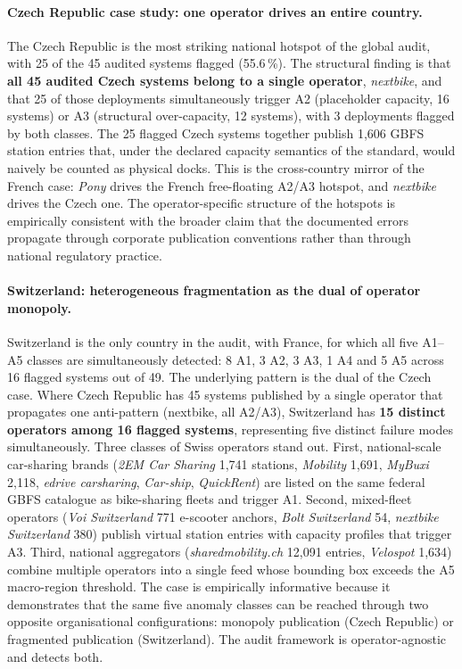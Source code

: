 \documentclass[11pt,a4paper]{article}
\begin{document}
\paragraph{Czech Republic case study: one operator drives an entire country.}
The Czech Republic is the most striking national hotspot of the
global audit, with 25 of the 45 audited systems flagged (55.6\,\%).
The structural finding is that \textbf{all 45 audited Czech systems
belong to a single operator}, \emph{nextbike}, and that 25 of those
deployments simultaneously trigger A2 (placeholder capacity, 16
systems) or A3 (structural over-capacity, 12 systems), with 3
deployments flagged by both classes. The 25 flagged Czech systems
together publish 1{,}606 GBFS station entries that, under the
declared capacity semantics of the standard, would naively be
counted as physical docks. This is the cross-country mirror of the
French case: \emph{Pony} drives the French free-floating A2/A3
hotspot, and \emph{nextbike} drives the Czech one. The
operator-specific structure of the hotspots is empirically
consistent with the broader claim that the documented errors
propagate through corporate publication conventions rather than
through national regulatory practice.

\paragraph{Switzerland: heterogeneous fragmentation as the dual of operator monopoly.}
Switzerland is the only country in the audit, with France, for which
all five A1--A5 classes are simultaneously detected: 8 A1, 3 A2, 3
A3, 1 A4 and 5 A5 across 16 flagged systems out of 49. The
underlying pattern is the dual of the Czech case. Where Czech
Republic has 45 systems published by a single operator that
propagates one anti-pattern (nextbike, all A2/A3), Switzerland has
\textbf{15 distinct operators among 16 flagged systems},
representing five distinct failure modes simultaneously. Three
classes of Swiss operators stand out. First, national-scale
car-sharing brands (\emph{2EM Car Sharing} 1{,}741 stations,
\emph{Mobility} 1{,}691, \emph{MyBuxi} 2{,}118, \emph{edrive
carsharing}, \emph{Car-ship}, \emph{QuickRent}) are listed on the
same federal GBFS catalogue as bike-sharing fleets and trigger A1.
Second, mixed-fleet operators (\emph{Voi Switzerland} 771 e-scooter
anchors, \emph{Bolt Switzerland} 54, \emph{nextbike Switzerland}
380) publish virtual station entries with capacity profiles that
trigger A3. Third, national aggregators
(\emph{sharedmobility.ch} 12{,}091 entries, \emph{Velospot} 1{,}634)
combine multiple operators into a single feed whose bounding box
exceeds the A5 macro-region threshold. The case is empirically
informative because it demonstrates that the same five anomaly
classes can be reached through two opposite organisational
configurations: monopoly publication (Czech Republic) or
fragmented publication (Switzerland). The audit framework is
operator-agnostic and detects both.
\end{document}
